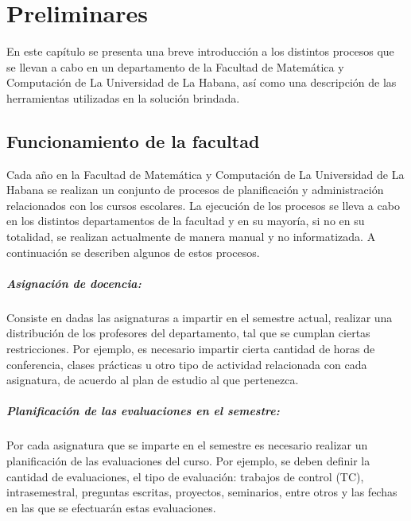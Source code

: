 \chapter{Preliminares}\label{chapter:preliminaries}
En este capítulo se presenta una breve introducción a los distintos 
procesos que se llevan a cabo en un departamento de la Facultad
de Matemática y Computación de La Universidad de La Habana, así
como una descripción de las herramientas utilizadas en la 
solución brindada. 

\section{Funcionamiento de la facultad}
Cada año en la Facultad de Matemática y Computación de La 
Universidad de La Habana se realizan un conjunto de procesos de 
planificación y administración relacionados con los cursos escolares.
La ejecución de los procesos se lleva a cabo en los distintos
departamentos de la facultad y en su mayoría, si no en su totalidad,
se realizan actualmente de manera manual y no informatizada.
A continuación se describen algunos de estos procesos.

\paragraph{Asignación de docencia:}
Consiste en dadas las asignaturas a impartir en el semestre actual,
realizar una distribución de los profesores del departamento, tal que se 
cumplan ciertas restricciones. Por ejemplo, es necesario impartir
cierta cantidad de horas de conferencia, clases prácticas u otro tipo de actividad 
relacionada con cada asignatura, de acuerdo al plan de estudio al que pertenezca.

\paragraph{Planificación de las evaluaciones en el semestre:}
Por cada asignatura que se imparte en el semestre es necesario realizar un planificación de 
las evaluaciones del curso. Por ejemplo, se deben definir la cantidad de evaluaciones, el tipo 
de evaluación: trabajos de control (TC), intrasemestral, preguntas escritas, proyectos, seminarios, entre 
otros y las fechas en las que se efectuarán estas evaluaciones.

